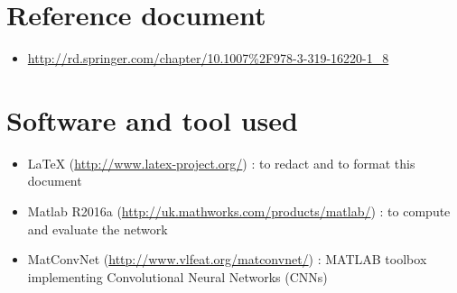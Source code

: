 \documentclass[]{report}
\begin{document}
\section{Reference document}
 \begin{itemize}
 
 	\item\url{http://rd.springer.com/chapter/10.1007%2F978-3-319-16220-1_8}
	
 \end{itemize}

\section{Software and tool used}

\begin{itemize}
	
	\item LaTeX (\url{http://www.latex-project.org/}) : to redact and to format this document
	
	\item Matlab R2016a (\url{http://uk.mathworks.com/products/matlab/}) : to compute and 					  evaluate the network
	
	\item MatConvNet (\url{http://www.vlfeat.org/matconvnet/}) : MATLAB toolbox implementing 				  Convolutional Neural Networks (CNNs) 
	 
\end{itemize}
\end{document}
